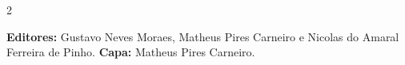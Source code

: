 \documentclass[11pt,a4paper]{article}
\begin{document}
\sloppy

\newcommand{\edicaoMes}{OUTUBRO}
\newcommand{\edicaoAno}{2026}





\begin{multicols}{2}


\vspace{50mm}


\vspace{20mm}

%
%




{\color{gray}
\textbf{Editores:}
Gustavo Neves Moraes, Matheus Pires Carneiro e Nicolas do Amaral Ferreira de Pinho.
\vspace{0.1cm}
\textbf{Capa:}
Matheus Pires Carneiro.
}

\end{multicols}
\end{document}
